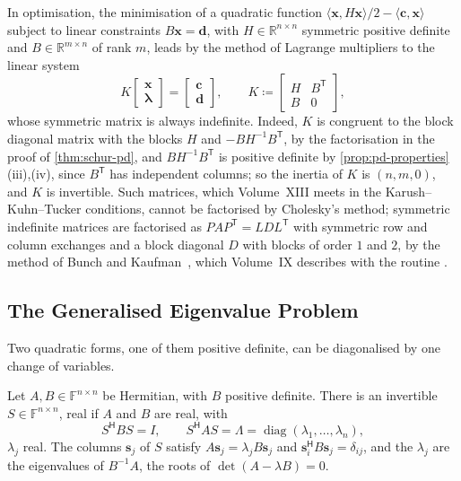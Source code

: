In optimisation, the minimisation of a quadratic function $\langle\mathbf x,H\mathbf x\rangle/2-\langle\mathbf c,\mathbf x\rangle$ subject to linear constraints $B\mathbf x=\mathbf d$, with $H\in\mathbb R^{n\times n}$ symmetric positive definite and $B\in\mathbb R^{m\times n}$ of rank $m$, leads by the method of Lagrange multipliers to the linear system
\[
K\begin{bmatrix}\mathbf x\\\boldsymbol\lambda\end{bmatrix}=\begin{bmatrix}\mathbf c\\\mathbf d\end{bmatrix},\qquad K\coloneqq\begin{bmatrix}H&B^{\mathsf T}\\B&0\end{bmatrix},
\]
whose symmetric matrix is always indefinite. Indeed, $K$ is congruent to the block diagonal matrix with the blocks $H$ and $-BH^{-1}B^{\mathsf T}$, by the factorisation in the proof of \cref{thm:schur-pd}, and $BH^{-1}B^{\mathsf T}$ is positive definite by \cref{prop:pd-properties}\,(iii),(iv), since $B^{\mathsf T}$ has independent columns; so the inertia of $K$ is $(n,m,0)$, and $K$ is invertible. Such matrices, which Volume~XIII meets in the Karush--Kuhn--Tucker conditions, cannot be factorised by Cholesky's method; symmetric indefinite matrices are factorised as $PAP^{\mathsf T}=LDL^{\mathsf T}$ with symmetric row and column exchanges and a block diagonal $D$ with blocks of order $1$ and $2$, by the method of Bunch and Kaufman~\cite{bunchkaufman1977}, which Volume~IX describes with the routine .

\subsection{The Generalised Eigenvalue Problem}

Two quadratic forms, one of them positive definite, can be diagonalised by one change of variables.

\begin{theorem}
\label{thm:generalised-eigen}
Let $A,B\in\mathbb F^{n\times n}$ be Hermitian, with $B$ positive definite. There is an invertible $S\in\mathbb F^{n\times n}$, real if $A$ and $B$ are real, with
\[
S^{\mathsf H}BS=I,\qquad S^{\mathsf H}AS=\Lambda=\operatorname{diag}(\lambda_1,\ldots,\lambda_n),
\]
$\lambda_j$ real. The columns $\mathbf s_j$ of $S$ satisfy $A\mathbf s_j=\lambda_jB\mathbf s_j$ and $\mathbf s_i^{\mathsf H}B\mathbf s_j=\delta_{ij}$, and the $\lambda_j$ are the eigenvalues of $B^{-1}A$, the roots of $\det(A-\lambda B)=0$.
\end{theorem}

